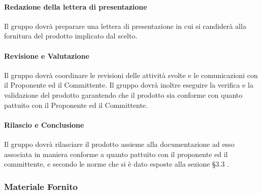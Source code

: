             \paragraph{Redazione della lettera di presentazione}
                Il gruppo dovrà preparare una lettera di presentazione in cui si candiderà alla fornitura del prodotto implicato dal  scelto.\\
            \paragraph{Revisione e Valutazione}
                Il gruppo dovrà coordinare le revisioni delle attività svolte e le comunicazioni con il Proponente ed il Committente. Il gruppo dovrà inoltre eseguire la verifica e la validazione del prodotto garantendo che il prodotto sia conforme con quanto pattuito con il Proponente ed il Committente.\\
            \paragraph{Rilascio e Conclusione}
                Il gruppo dovrà rilasciare il prodotto assieme alla documentazione ad esso associata in maniera conforme a quanto pattuito con il proponente ed il committente, e secondo le norme che si è dato esposte alla sezione §3.3 .\\
        
        \subsubsection{Materiale Fornito}
